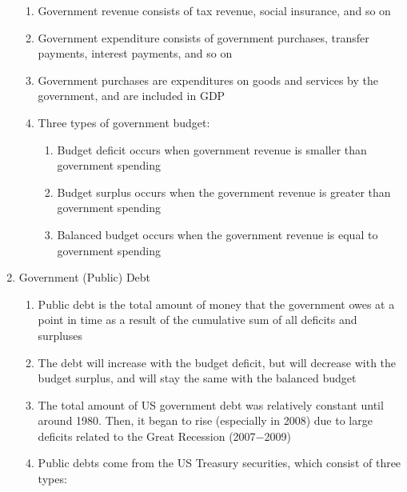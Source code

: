 \documentclass[12pt]{article}
\begin{document}
\begin{enumerate}
\begin{enumerate}
          \item Government revenue consists of tax revenue, social insurance, and so on

          \item Government expenditure consists of government purchases, transfer payments, interest payments, and so on

          \item Government purchases are expenditures on goods and services by the government, and are included in GDP

          \item Three types of government budget:

            \begin{enumerate}

              \item Budget deficit occurs when government revenue is smaller than government spending

              \item Budget surplus occurs when the government revenue is greater than government spending

              \item Balanced budget occurs when the government revenue is equal to government spending

            \end{enumerate}

        \end{enumerate}

      \item Government (Public) Debt

        \begin{enumerate}

          \item Public debt is the total amount of money that the government owes at a point in time as a result of the cumulative sum of all deficits and surpluses 

          \item The debt will increase with the budget deficit, but will decrease with the budget surplus, and will stay the same with the balanced budget

          \item The total amount of US government debt was relatively constant until around 1980. Then, it began to rise (especially in 2008) due to large deficits related to the Great Recession (2007$-$2009)

          \item Public debts come from the US Treasury securities, which consist of three types:


\end{enumerate}
\end{enumerate}
\end{document}
